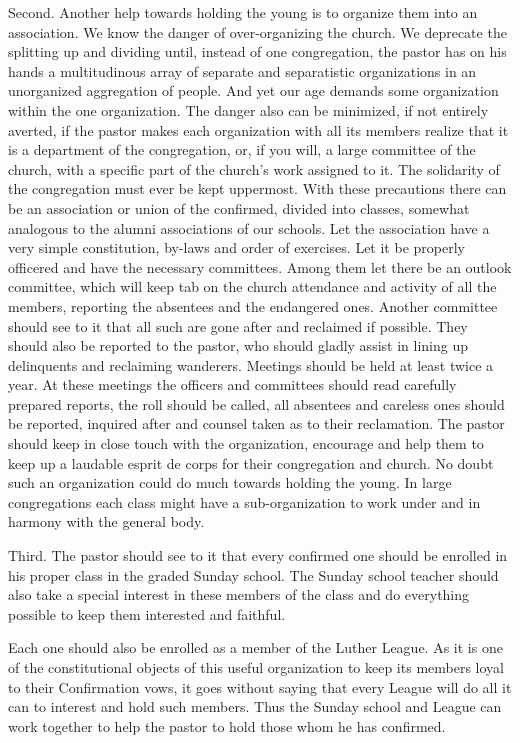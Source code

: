 Second. Another help towards holding the young is to organize them into an association. We know the danger of over-organizing the church. We deprecate the splitting up and dividing until, instead of one congregation, the pastor has on his hands a multitudinous array of separate and separatistic organizations in an unorganized aggregation of
people.  And yet our age demands some organization within the one organization. The danger also can be minimized, if not entirely averted, if the pastor makes each organization with all its members realize that it is a department of the congregation, or, if you will, a large committee of the church, with a specific part of the church’s work assigned to it. The solidarity of the congregation must ever be kept uppermost. With these precautions there can be an association or union of the confirmed, divided into classes, somewhat analogous to the alumni associations of our schools. Let the association have a very simple constitution, by-laws and order of exercises. Let it be properly officered and have the necessary committees. Among them let there be an outlook committee, which will keep tab on the church attendance and activity of all the members, reporting the absentees and the endangered ones. Another committee should see to it that all such are gone after and reclaimed if possible. They should also be reported to the pastor, who should gladly assist in lining up delinquents and reclaiming wanderers. Meetings should be held at least twice a year. At these meetings the officers and committees should read carefully prepared reports, the roll should be called, all absentees and careless ones should be reported, inquired after and counsel taken as to their reclamation. The pastor should keep in
close touch with the organization, encourage and help them to keep up a laudable esprit de corps for their congregation and church. No doubt such an organization could do much towards holding the young. In large congregations each class might have a sub-organization to work under and in harmony with the general body. 

 Third. The pastor should see to it that every confirmed one should be enrolled in his proper class in the graded Sunday school. The Sunday school teacher should also take a special interest in these members of the class and do everything possible to keep them interested and faithful. 

 Each one should also be enrolled as a member of the Luther League. As it is one of the constitutional objects of this useful organization to keep its members loyal to their Confirmation vows, it goes without saying that every League will do all it can to interest and hold such members. Thus the Sunday school and League can work together to help the pastor to hold those whom he has confirmed. 

